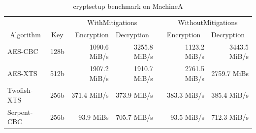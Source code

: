 \documentclass{csfourzero}
\begin{document}
\begin{table}[h]
\centering
\begin{tabular}{@{}lcrrrrr@{}}
\multicolumn{1}{c}{}          & \multicolumn{1}{l}{} & \multicolumn{2}{c}{WithMitigations}           & \multicolumn{1}{l}{} & \multicolumn{2}{c}{WithoutMitigations}                          \\ \cmidrule(r){1-4} \cmidrule(l){6-7} 
\multicolumn{1}{c}{Algorithm} & Key                  & Encryption   & \multicolumn{1}{l}{Decryption} & \multicolumn{1}{l}{} & \multicolumn{1}{l}{Encryption} & \multicolumn{1}{l}{Decryption} \\ \cmidrule(r){1-4} \cmidrule(l){6-7} 
AES-CBC                       & 128b                 & 1090.6 MiB/s & 3255.8 MiB/s                   &                      & 1123.2 MiB/s                   & 3443.5 MiB/s                   \\
AES-XTS                       & 512b                 & 1907.2 MiB/s & 1910.7 MiB/s                   &                      & 2761.5 MiB/s                   & 2759.7 MiBs                    \\
Twofish-XTS                   & 256b                 & 371.4 MiB/s  & 373.9 MiB/s                    &                      & 383.3 MiB/s                    & 385.4 MiB/s                    \\
Serpent-CBC                   & 256b                 & 93.9 MiBs    & 705.7 MiB/s                    &                      & 93.5 MiB/s                     & 712.3 MiB/s                    \\ \cmidrule(r){1-4} \cmidrule(l){6-7} 
\end{tabular}
\caption{cryptsetup benchmark on MachineA}
\label{tab:cryptoA}
\end{table}
\end{document}
